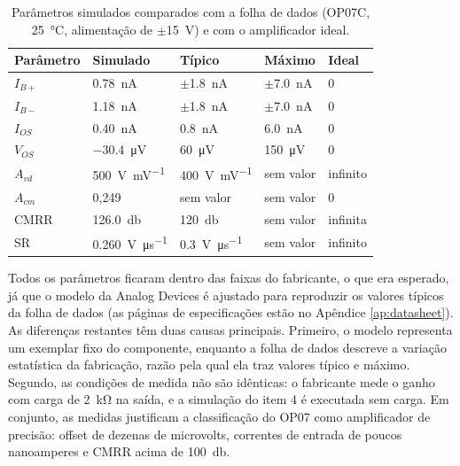 \begin{table}[htb]
  \centering
  \caption{Parâmetros simulados comparados com a folha de dados (OP07C,
  \SI{25}{\celsius}, alimentação de $\pm$\SI{15}{\volt}) e com o
  amplificador ideal.}
  \label{tab:medidas}
  \begin{tabular}{lllll}
    \toprule
    Parâmetro & Simulado & Típico & Máximo & Ideal \\
    \midrule
    $I_{B+}$ & \SI{0.78}{\nano\ampere} & $\pm$\SI{1.8}{\nano\ampere} & $\pm$\SI{7.0}{\nano\ampere} & 0 \\
    $I_{B-}$ & \SI{1.18}{\nano\ampere} & $\pm$\SI{1.8}{\nano\ampere} & $\pm$\SI{7.0}{\nano\ampere} & 0 \\
    $I_{OS}$ & \SI{0.40}{\nano\ampere} & \SI{0.8}{\nano\ampere} & \SI{6.0}{\nano\ampere} & 0 \\
    $V_{OS}$ & \SI{-30.4}{\micro\volt} & \SI{60}{\micro\volt} & \SI{150}{\micro\volt} & 0 \\
    $A_{vd}$ & \SI{500}{\volt\per\milli\volt} & \SI{400}{\volt\per\milli\volt} & sem valor & infinito \\
    $A_{cm}$ & 0,249 & sem valor & sem valor & 0 \\
    CMRR & \SI{126.0}{\decibel} & \SI{120}{\decibel} & sem valor & infinita \\
    SR & \SI{0.260}{\volt\per\micro\second} & \SI{0.3}{\volt\per\micro\second} & sem valor & infinito \\
    \bottomrule
  \end{tabular}
\end{table}

Todos os parâmetros ficaram dentro das faixas do fabricante, o que era
esperado, já que o modelo da Analog Devices é ajustado para
reproduzir os valores típicos da folha de dados (as páginas de
especificações estão no Apêndice \ref{ap:datasheet}). As diferenças restantes têm duas causas principais. Primeiro, o modelo
representa um exemplar fixo do componente, enquanto a folha de dados
descreve a variação estatística da fabricação, razão pela qual ela traz
valores típico e máximo. Segundo, as condições de medida não são
idênticas: o fabricante mede o ganho com carga de \SI{2}{\kilo\ohm} na
saída, e a simulação do item 4 é executada sem carga. Em conjunto, as
medidas justificam a classificação do OP07 como amplificador de
precisão: offset de dezenas de microvolts, correntes de entrada de
poucos nanoamperes e CMRR acima de \SI{100}{\decibel}.
